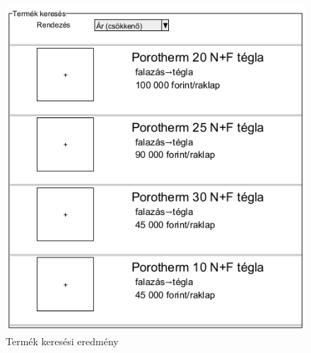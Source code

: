 \begin{figure}[h]
	\centering
	\includegraphics[scale=0.5]{img/termek_eredmeny.png}
	\caption*{Termék keresési eredmény}
	\label{fig:term_ker_ered}
\end{figure}